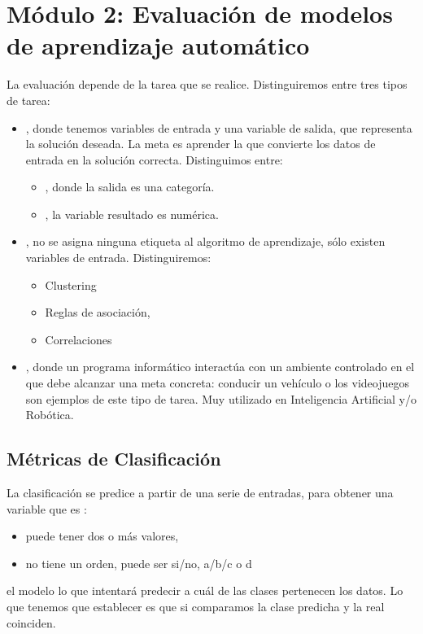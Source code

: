 \chapter{Módulo 2: Evaluación de modelos de aprendizaje automático}

La  evaluación depende de la tarea que se realice. Distinguiremos entre tres tipos de tarea:

\begin{itemize}
    \item {}, donde tenemos variables de entrada y una variable de salida, que representa la solución deseada. La meta es aprender la  que convierte los datos de entrada en la solución correcta. Distinguimos entre:
    \begin{itemize}
        \item {}, donde la salida es una categoría.
        \item {}, la variable resultado es numérica.
    \end{itemize}
    \item {}, no se asigna ninguna etiqueta al algoritmo de aprendizaje, sólo existen variables de entrada. Distinguiremos:
    \begin{itemize}
        \item Clustering
        \item Reglas de asociación, 
        \item Correlaciones
    \end{itemize}
    \item {}, donde un programa informático interactúa con un ambiente controlado en el que debe alcanzar una meta concreta: conducir un vehículo o los videojuegos son ejemplos de este tipo de tarea. Muy utilizado en Inteligencia Artificial y/o Robótica.
\end{itemize}

\section{Métricas de Clasificación}

La clasificación se predice a partir de una serie de entradas, para obtener una variable que es :
\begin{itemize}
    \item puede tener dos o más valores, 
    \item no tiene un orden, puede ser si/no, a/b/c o d
\end{itemize} 
el modelo lo que intentará predecir a cuál de las clases pertenecen los datos. Lo que tenemos que establecer es que si comparamos la clase predicha y la real coinciden.

